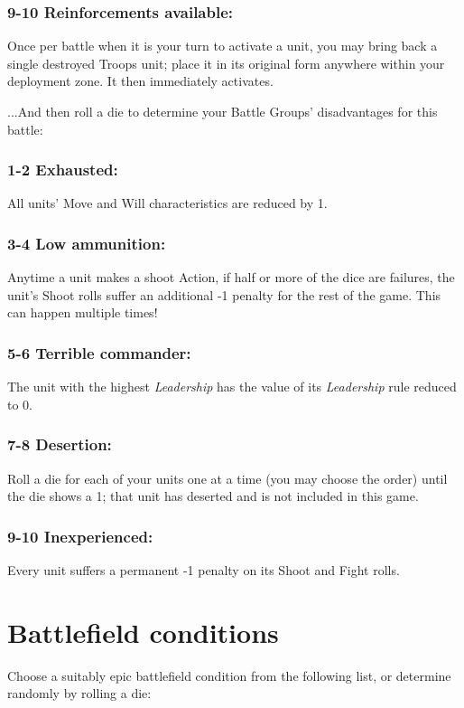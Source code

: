 \begin{multicols}{2}
\subsubsection*{9-10 Reinforcements available:} Once per battle when it is your turn to activate a unit, you may bring back a single destroyed Troops unit; place it in its original form anywhere within your deployment zone. It then immediately activates.

\vspace{2em}

...And then roll a die to determine your Battle Groups' disadvantages for this battle:

\subsubsection*{1-2 Exhausted:} All units' Move and Will characteristics are reduced by 1.

\subsubsection*{3-4 Low ammunition:} Anytime a unit makes a shoot Action, if half or more of the dice are failures, the unit's Shoot rolls suffer an additional -1 penalty for the rest of the game. This can happen multiple times!

\subsubsection*{5-6 Terrible commander:} The unit with the highest \textit{Leadership} has the value of its \textit{Leadership} rule reduced to 0.

\subsubsection*{7-8 Desertion:} Roll a die for each of your units one at a time (you may choose the order) until the die shows a 1; that unit has deserted and is not included in this game.

\subsubsection*{9-10 Inexperienced:} Every unit suffers a permanent -1 penalty on its Shoot and Fight rolls.




\section*{Battlefield conditions}
Choose a suitably epic battlefield condition from the following list, or determine randomly by rolling a die:


\end{multicols}
